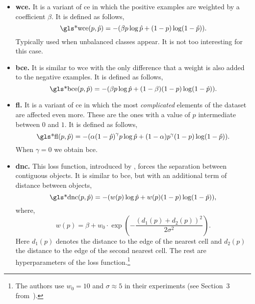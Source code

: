 \begin{itemize}
  \item \textbf{\gls{wce}.} It is a variant of \gls{ce} in which the positive
  examples are weighted by a coefficient \(\beta\). It is defined as follows,
  \begin{equation}
    \text{\gls*{wce}}(p, \hat{p}) =
    -(\beta p\log\hat{p} + (1 - p)\log(1 - \hat{p})).
  \end{equation}
  Typically used when unbalanced classes appear. It is not too interesting for
  this case.
  \item \textbf{\gls{bce}.} It is similar to \gls{wce} with the only difference
  that a weight is also added to the negative examples. It is defined as
  follows,
  \begin{equation}
    \text{\gls*{bce}}(p, \hat{p}) =
    -(\beta p\log\hat{p} + (1 - \beta)(1 - p)\log(1 - \hat{p})).
  \end{equation}
  \item \textbf{\gls{fl}.} It is a variant of \gls{ce} in which the most
  \emph{complicated} elements of the dataset are affected even more. These are
  the ones with a value of \(\hat{p}\) intermediate between \(0\) and \(1\). It
  is defined as follows,
  \begin{equation}
    \text{\gls*{fl}}(p, \hat{p}) =
    -(\alpha {(1 - \hat{p})}^\gamma p\log\hat{p} +
    (1 - \alpha)p^\gamma (1 - p)\log(1 - \hat{p})).
  \end{equation}
  When \(\gamma = 0\) we obtain \gls{bce}.
  \item \textbf{\gls{dnc}.} This loss function, introduced by
  , forces the separation between contiguous
  objects. It is similar to \gls{bce}, but with an additional term of distance
  between objects,
  \begin{equation}
    \text{\gls*{dnc}}(p, \hat{p}) =
    -(w(p)\log\hat{p} + w(p)(1 - p)\log(1 - \hat{p})),
  \end{equation}
  where,
  \begin{equation}
    w(p) = \beta +
    w_0 \cdot \exp\left(-\frac{{(d_1(p) + d_2(p))}^2}{2\sigma^2}\right).
  \end{equation}
  Here \(d_1(p)\) denotes the distance to the edge of the nearest cell and
  \(d_2(p)\) the distance to the edge of the second nearest cell. The rest are
  hyperparameters of the loss function.\footnote{The authors use \(w_0 = 10\)
    and \(\sigma \approx 5\) in their experiments (see Section~3
    from~\cite{ronneberger15:u}).}
\end{itemize}


